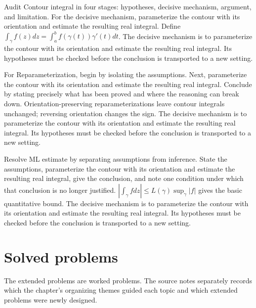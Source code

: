 \begin{example}\label{ex:iv04-worked-02}
Audit Contour integral in four stages: hypotheses, decisive mechanism, argument, and limitation. For the decisive mechanism, parameterize the contour with its orientation and estimate the resulting real integral. Define $\int_\gamma f(z)dz=\int_a^bf(\gamma(t))\gamma'(t)dt$. The decisive mechanism is to parameterize the contour with its orientation and estimate the resulting real integral. Its hypotheses must be checked before the conclusion is transported to a new setting.
\end{example}

\begin{example}\label{ex:iv04-worked-03}
For Reparameterization, begin by isolating the assumptions. Next, parameterize the contour with its orientation and estimate the resulting real integral. Conclude by stating precisely what has been proved and where the reasoning can break down. Orientation-preserving reparameterizations leave contour integrals unchanged; reversing orientation changes the sign. The decisive mechanism is to parameterize the contour with its orientation and estimate the resulting real integral. Its hypotheses must be checked before the conclusion is transported to a new setting.
\end{example}

\begin{example}\label{ex:iv04-worked-04}
Resolve ML estimate by separating assumptions from inference. State the assumptions, parameterize the contour with its orientation and estimate the resulting real integral, give the conclusion, and note one condition under which that conclusion is no longer justified. $|\int_\gamma fdz|\le L(\gamma)\sup_\gamma|f|$ gives the basic quantitative bound. The decisive mechanism is to parameterize the contour with its orientation and estimate the resulting real integral. Its hypotheses must be checked before the conclusion is transported to a new setting.
\end{example}

\section{Solved problems}
The extended problems are worked problems. The source notes separately records which the chapter's organizing themes guided each topic and which extended problems were newly designed.

